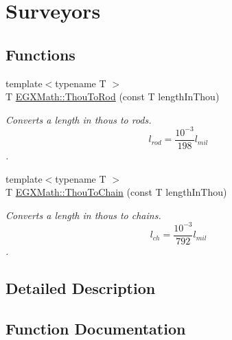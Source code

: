 \hypertarget{group___e_g_x_math-_conversions-_length_conversions-_imperial-_thou-_surveyors}{}\section{Surveyors}
\label{group___e_g_x_math-_conversions-_length_conversions-_imperial-_thou-_surveyors}
\subsection*{Functions}
\begin{DoxyCompactItemize}
\item 
{\footnotesize template$<$typename T $>$ }\\T \mbox{\hyperlink{group___e_g_x_math-_conversions-_length_conversions-_imperial-_thou-_surveyors_ga904d9983041eecd1dbcc92d29e21d5f3}{E\+G\+X\+Math\+::\+Thou\+To\+Rod}} (const T length\+In\+Thou)
\begin{DoxyCompactList}\small\item\em Converts a length in thous to rods. \[ l_{rod}= \frac{10^{-3}}{198} l_{mil} \]. \end{DoxyCompactList}\item 
{\footnotesize template$<$typename T $>$ }\\T \mbox{\hyperlink{group___e_g_x_math-_conversions-_length_conversions-_imperial-_thou-_surveyors_gafe0134eff7a5cc259ee143f60a4aeec7}{E\+G\+X\+Math\+::\+Thou\+To\+Chain}} (const T length\+In\+Thou)
\begin{DoxyCompactList}\small\item\em Converts a length in thous to chains. \[ l_{ch}= \frac{10^{-3}}{792} l_{mil} \]. \end{DoxyCompactList}\end{DoxyCompactItemize}


\subsection{Detailed Description}


\subsection{Function Documentation}
\mbox{\label{group___e_g_x_math-_conversions-_length_conversions-_imperial-_thou-_surveyors_gafe0134eff7a5cc259ee143f60a4aeec7}} 
